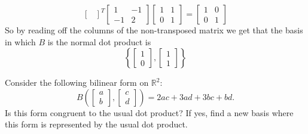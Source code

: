 \documentclass[11pt]{article}
\begin{document}
\begin{problem}
\begin{parts}
\begin{solution}
\[\begin{bmatrix}
        \end{bmatrix}^T
        \begin{bmatrix}
          1 & -1 \\
          -1 & 2
        \end{bmatrix}
        \begin{bmatrix}
          1 & 1 \\
          0 & 1
        \end{bmatrix}=
        \begin{bmatrix}
          1 & 0 \\
          0 & 1
        \end{bmatrix}
      \]
      So by reading off the columns of the non-transposed matrix we
      get that the basis in which \( B \) is the normal dot product is
      \[
        \left\{
          \begin{bmatrix}
            1 \\ 0
          \end{bmatrix},
          \begin{bmatrix}
            1 \\ 1
          \end{bmatrix}
        \right\}
      \]
    \end{solution}
    \newpage

  \item Consider the following bilinear form on $\mathbb{R}^2$:
    \[
      B\!\left(
        \begin{bmatrix}a\\b
        \end{bmatrix},
        \begin{bmatrix}c\\d
      \end{bmatrix}\right)
      = 2ac + 3ad + 3bc + bd.
    \]
    Is this form congruent to the usual dot product? If yes, find a new basis
    where this form is represented by the usual dot product.


\end{parts}
\end{problem}
\end{document}
